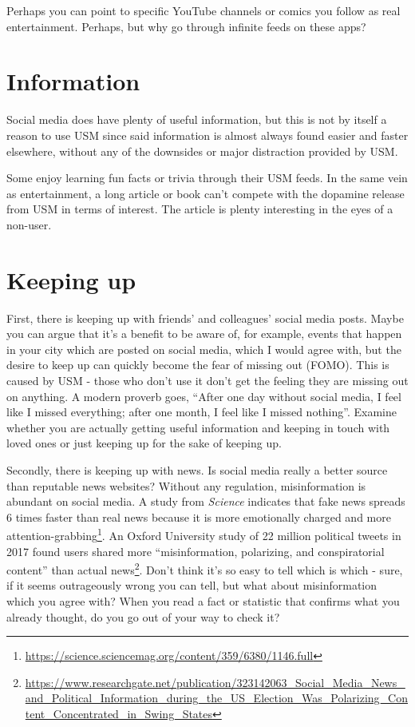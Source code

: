 \documentclass[
]{book}
\begin{document}
Perhaps you can point to specific YouTube channels or comics you follow as real entertainment. Perhaps, but why go through infinite feeds on these apps?

\section{Information}\label{information}

Social media does have plenty of useful information, but this is not by itself a reason to use USM since said information is almost always found easier and faster elsewhere, without any of the downsides or major distraction provided by USM.

Some enjoy learning fun facts or trivia through their USM feeds.
In the same vein as entertainment, a long article or book can't compete with the dopamine release from USM in terms of interest. The article is plenty interesting in the eyes of a non-user.

\section{Keeping up}\label{keeping-up}

First, there is keeping up with friends' and colleagues' social media posts. Maybe you can argue that it's a benefit to be aware of, for example, events that happen in your city which are posted on social media, which I would agree with, but the desire to keep up can quickly become the fear of missing out (FOMO). This is caused by USM - those who don't use it don't get the feeling they are missing out on anything. A modern proverb goes, ``After one day without social media, I feel like I missed everything; after one month, I feel like I missed nothing''. Examine whether you are actually getting useful information and keeping in touch with loved ones or just keeping up for the sake of keeping up.

Secondly, there is keeping up with news. Is social media really a better source than reputable news websites? Without any regulation, misinformation is abundant on social media. A study from \emph{Science} indicates that fake news spreads 6 times faster than real news because it is more emotionally charged and more attention-grabbing\footnote{\url{https://science.sciencemag.org/content/359/6380/1146.full}}. An Oxford University study of 22 million political tweets in 2017 found users shared more ``misinformation, polarizing, and conspiratorial content'' than actual news\footnote{\url{https://www.researchgate.net/publication/323142063_Social_Media_News_and_Political_Information_during_the_US_Election_Was_Polarizing_Content_Concentrated_in_Swing_States}}. Don't think it's so easy to tell which is which - sure, if it seems outrageously wrong you can tell, but what about misinformation which you agree with? When you read a fact or statistic that confirms what you already thought, do you go out of your way to check it?
\end{document}
